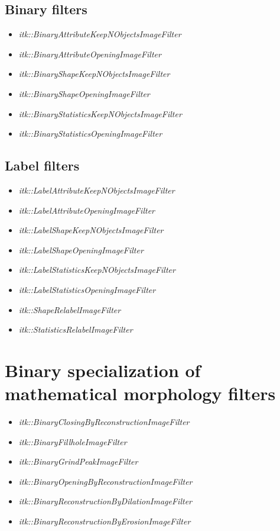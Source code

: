 \documentclass{InsightArticle}
\begin{document}
\subsection{Binary filters}

\begin{itemize}
  \item {\em itk::BinaryAttributeKeepNObjectsImageFilter}
  \item {\em itk::BinaryAttributeOpeningImageFilter}
  \item {\em itk::BinaryShapeKeepNObjectsImageFilter}
  \item {\em itk::BinaryShapeOpeningImageFilter}
  \item {\em itk::BinaryStatisticsKeepNObjectsImageFilter}
  \item {\em itk::BinaryStatisticsOpeningImageFilter}
\end{itemize}

\subsection{Label filters}

\begin{itemize}
  \item {\em itk::LabelAttributeKeepNObjectsImageFilter}
  \item {\em itk::LabelAttributeOpeningImageFilter}
  \item {\em itk::LabelShapeKeepNObjectsImageFilter}
  \item {\em itk::LabelShapeOpeningImageFilter}
  \item {\em itk::LabelStatisticsKeepNObjectsImageFilter}
  \item {\em itk::LabelStatisticsOpeningImageFilter}
  \item {\em itk::ShapeRelabelImageFilter}
  \item {\em itk::StatisticsRelabelImageFilter}
\end{itemize}

\section{Binary specialization of mathematical morphology filters}

\begin{itemize}
  \item {\em itk::BinaryClosingByReconstructionImageFilter}
  \item {\em itk::BinaryFillholeImageFilter}
  \item {\em itk::BinaryGrindPeakImageFilter}
  \item {\em itk::BinaryOpeningByReconstructionImageFilter}
  \item {\em itk::BinaryReconstructionByDilationImageFilter}
  \item {\em itk::BinaryReconstructionByErosionImageFilter}
\end{itemize}
\end{document}
